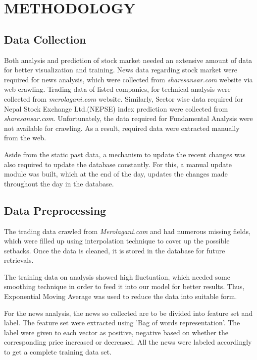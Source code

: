 \section{METHODOLOGY}
\subsection{Data Collection}
Both analysis and prediction of stock market needed an extensive amount of data for better visualization and training. News data regarding stock market were required for news analysis, which were collected from \textit{sharesansar.com} website via web crawling. Trading data of listed companies, for technical analysis were collected from \textit{merolagani.com} website. Similarly, Sector wise data required for Nepal Stock Exchange Ltd.(NEPSE)  index prediction were collected from \textit{sharesansar.com}. Unfortunately, the data required for Fundamental Analysis were not available for crawling. As a result, required data were extracted manually from the web.

Aside from the static past data, a mechanism to update the recent changes was also required to update the database constantly. For this, a manual update module was built, which at the end of the day, updates the changes made throughout the day in the database.

\subsection{Data Preprocessing}
The trading data crawled from \textit{Merolagani.com} and  had numerous missing fields, which were filled up using interpolation technique to cover up the possible setbacks. Once the data is cleaned, it is stored in the database for future retrievals.

The training data on analysis showed high fluctuation, which needed some smoothing technique in order to feed it into our model for better results. Thus, Exponential Moving Average was used to reduce the data into suitable form.

For the news analysis, the news so collected are to be divided into feature set and label. The feature set were extracted using 'Bag of words representation'. The label were given to each vector as positive, negative based on whether the corresponding price increased or decreased. All the news were labeled accordingly to get a complete training data set.

